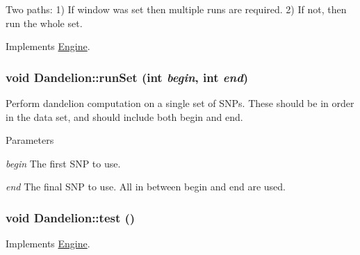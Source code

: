 Two paths: 1) If window was set then multiple runs are required. 2) If not, then run the whole set. 

Implements \hyperlink{classEngine_a005f8e277c3dea16ea05803fba223db7}{Engine}.

\hypertarget{classDandelion_adf05e6be9d35362f836768eb1b7f22d8}{
\subsubsection[{runSet}]{\setlength{\rightskip}{0pt plus 5cm}void Dandelion::runSet (int {\em begin}, \/  int {\em end})}}
\label{classDandelion_adf05e6be9d35362f836768eb1b7f22d8}
Perform dandelion computation on a single set of SNPs. These should be in order in the data set, and should include both begin and end.


\begin{DoxyParams}{Parameters}
\item[{\em begin}]The first SNP to use. \item[{\em end}]The final SNP to use. All in between begin and end are used. \end{DoxyParams}
\hypertarget{classDandelion_aad49aeddeaaf1aa98da869d94777e130}{
\subsubsection[{test}]{\setlength{\rightskip}{0pt plus 5cm}void Dandelion::test ()}}
\label{classDandelion_aad49aeddeaaf1aa98da869d94777e130}


Implements \hyperlink{classEngine_a2927c4a4263809453063ad482c6434a4}{Engine}.



